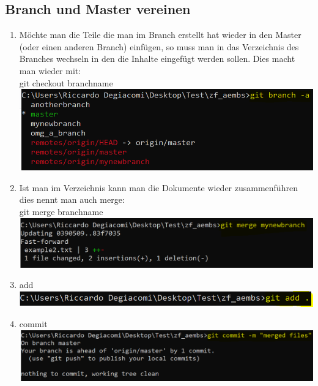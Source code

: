 \documentclass[a4paper, 8pt]{extarticle}
\begin{document}
\begin{multicols*}{3}
            \section{Branch und Master vereinen}
                 \begin{enumerate}
                    \item  Möchte man die Teile die man im Branch erstellt hat wieder in den Master (oder einen anderen Branch) einfügen,
                            so muss man in das Verzeichnis des Branches wechseln in den die Inhalte eingefügt werden sollen.
                            Dies macht man wieder mit:\\
                            git checkout branchname\\
                                \includegraphics[width=1\linewidth, left]{img/git_merge_destination_branch_check.PNG}\\ 
                    \item   Ist man im Verzeichnis kann man die Dokumente wieder zusammenführen dies nennt man auch merge:\\
                            git merge branchname\\
                                \includegraphics[width=1\linewidth, left]{img/git_merge_merge.PNG}\\ 
                    \item   add\\
                                \includegraphics[width=1\linewidth, left]{img/git_merge_add.PNG}\\ 
                    \item   commit\\
                                \includegraphics[width=1\linewidth, left]{img/git_merge_commit.PNG}\\ 

\end{enumerate}
\end{multicols*}
\end{document}
